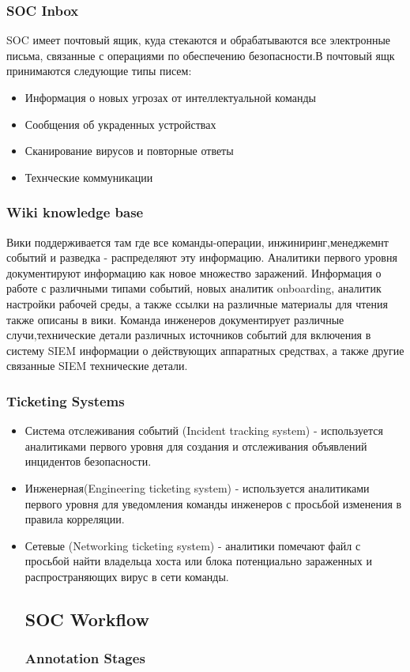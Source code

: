 \documentclass[12pt,]{article}
\begin{document}
\subsubsection{SOC Inbox}
SOC имеет почтовый ящик, куда стекаются и обрабатываются все электронные письма, связанные с операциями по обеспечению безопасности.В почтовый ящк принимаются следующие типы писем:
\begin{itemize}
\item Информация о новых угрозах от интеллектуальной команды
\item Сообщения об украденных устройствах
\item Сканирование вирусов и повторные ответы
\item Технческие коммуникации
\end{itemize}
\subsubsection{Wiki knowledge base}
Вики поддерживается там где все команды-операции, инжиниринг,менеджемнт событий и разведка - распределяют эту информацию. Аналитики первого уровня документируют информацию как новое множество заражений.
Информация о работе с различными типами событий, новых аналитик onboarding, аналитик настройки рабочей среды, а также ссылки на различные материалы для чтения также описаны в вики. Команда инженеров документирует различные случи,технические детали различных источников событий для включения в систему SIEM информации о действующих аппаратных средствах, а также другие связанные SIEM технические детали.
\subsubsection{Ticketing Systems}
\begin{itemize}
\item Система отслеживания событий (Incident tracking system) - используется аналитиками первого уровня для создания и отслеживания объявлений инцидентов безопасности.
\item Инженерная(Engineering ticketing system) - используется аналитиками первого уровня для уведомления команды инженеров с просьбой изменения в правила корреляции.
\item Сетевые (Networking ticketing system) -  аналитики помечают файл  с просьбой найти владельца хоста или блока потенциально зараженных и распространяющих вирус в сети команды.
\subsection{SOC Workflow}
\subsubsection{Annotation Stages}
\end{itemize}
\end{document}
